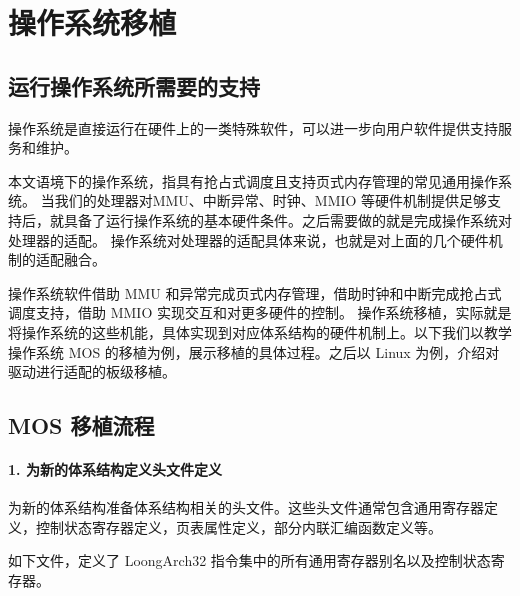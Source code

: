 
\chapter{操作系统移植}\label{chap:13-operating-system}

\section{运行操作系统所需要的支持}\label{sec:13-operating-system-001}

操作系统是直接运行在硬件上的一类特殊软件，可以进一步向用户软件提供支持服务和维护。

本文语境下的操作系统，指具有抢占式调度且支持页式内存管理的常见通用操作系统。
当我们的处理器对MMU、中断异常、时钟、MMIO 等硬件机制提供足够支持后，就具备了运行操作系统的基本硬件条件。之后需要做的就是完成操作系统对处理器的适配。
操作系统对处理器的适配具体来说，也就是对上面的几个硬件机制的适配融合。

操作系统软件借助 MMU 和异常完成页式内存管理，借助时钟和中断完成抢占式调度支持，借助 MMIO 实现交互和对更多硬件的控制。
操作系统移植，实际就是将操作系统的这些机能，具体实现到对应体系结构的硬件机制上。以下我们以教学操作系统 MOS 的移植为例，展示移植的具体过程。之后以 Linux 为例，介绍对驱动进行适配的板级移植。

\section{MOS 移植流程}\label{sec:13-operating-system-002}

\subsubsection{1. 为新的体系结构定义头文件定义}\label{sec:13-operating-system-003}

为新的体系结构准备体系结构相关的头文件。这些头文件通常包含通用寄存器定义，控制状态寄存器定义，页表属性定义，部分内联汇编函数定义等。

如下文件，定义了 LoongArch32 指令集中的所有通用寄存器别名以及控制状态寄存器。

